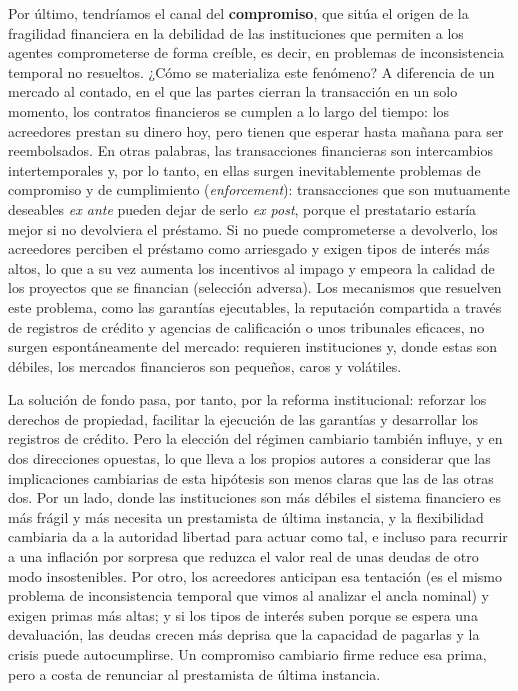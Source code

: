 \documentclass[10pt,a4paper]{article}
\begin{document}
Por último, tendríamos el canal del \textbf{compromiso}, que sitúa el origen de la fragilidad financiera en la debilidad de las instituciones que permiten a los agentes comprometerse de forma creíble, es decir, en problemas de inconsistencia temporal no resueltos. ¿Cómo se materializa este fenómeno? A diferencia de un mercado al contado, en el que las partes cierran la transacción en un solo momento, los contratos financieros se cumplen a lo largo del tiempo: los acreedores prestan su dinero hoy, pero tienen que esperar hasta mañana para ser reembolsados. En otras palabras, las transacciones financieras son intercambios intertemporales y, por lo tanto, en ellas surgen inevitablemente problemas de compromiso y de cumplimiento (\textit{enforcement}): transacciones que son mutuamente deseables \textit{ex ante} pueden dejar de serlo \textit{ex post}, porque el prestatario estaría mejor si no devolviera el préstamo. Si no puede comprometerse a devolverlo, los acreedores perciben el préstamo como arriesgado y exigen tipos de interés más altos, lo que a su vez aumenta los incentivos al impago y empeora la calidad de los proyectos que se financian (selección adversa). Los mecanismos que resuelven este problema, como las garantías ejecutables, la reputación compartida a través de registros de crédito y agencias de calificación o unos tribunales eficaces, no surgen espontáneamente del mercado: requieren instituciones y, donde estas son débiles, los mercados financieros son pequeños, caros y volátiles.

La solución de fondo pasa, por tanto, por la reforma institucional: reforzar los derechos de propiedad, facilitar la ejecución de las garantías y desarrollar los registros de crédito. Pero la elección del régimen cambiario también influye, y en dos direcciones opuestas, lo que lleva a los propios autores a considerar que las implicaciones cambiarias de esta hipótesis son menos claras que las de las otras dos. Por un lado, donde las instituciones son más débiles el sistema financiero es más frágil y más necesita un prestamista de última instancia, y la flexibilidad cambiaria da a la autoridad libertad para actuar como tal, e incluso para recurrir a una inflación por sorpresa que reduzca el valor real de unas deudas de otro modo insostenibles. Por otro, los acreedores anticipan esa tentación (es el mismo problema de inconsistencia temporal que vimos al analizar el ancla nominal) y exigen primas más altas; y si los tipos de interés suben porque se espera una devaluación, las deudas crecen más deprisa que la capacidad de pagarlas y la crisis puede autocumplirse. Un compromiso cambiario firme reduce esa prima, pero a costa de renunciar al prestamista de última instancia.
\end{document}

